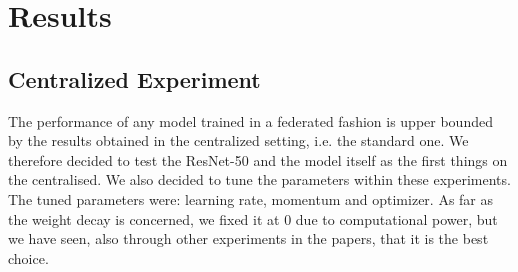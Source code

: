 \documentclass[conference]{IEEEtran}
\begin{document}
\section{Results}
\subsection{Centralized Experiment}
The performance of any model trained in a federated fashion is upper bounded by the results obtained in the centralized setting, i.e. the standard one. We therefore decided to test the ResNet-50 and the model itself as the first things on the centralised. We also decided to tune the parameters within these experiments. The tuned parameters were: learning rate, momentum and optimizer. As far as the weight decay is concerned, we fixed it at 0 due to computational power, but we have seen, also through other experiments in the papers, that it is the best choice.
\end{document}
